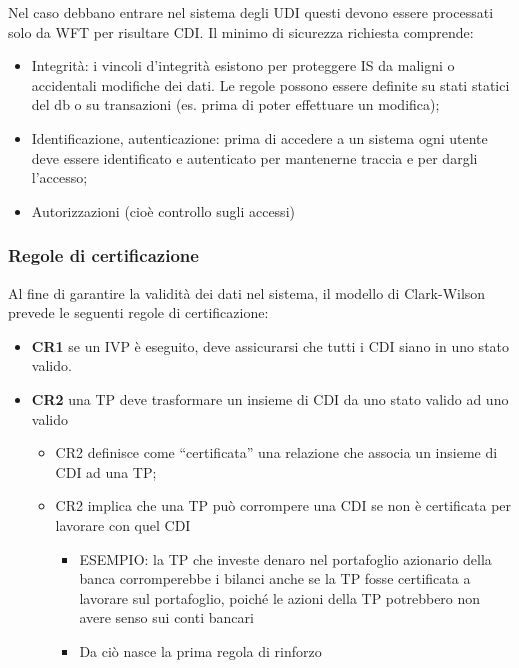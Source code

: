 Nel caso debbano entrare nel sistema degli UDI questi devono essere processati 
solo da WFT per
risultare CDI.
Il minimo di sicurezza richiesta comprende:
\begin{itemize}
      \item Integrità: i vincoli d’integrità esistono per proteggere IS da
            maligni o accidentali modifiche
            dei dati. Le regole possono essere definite su stati statici del db 
            o su transazioni (es. prima
            di poter effettuare un modifica);
      \item Identificazione, autenticazione: prima di accedere a un sistema ogni
            utente deve essere
            identificato e autenticato per mantenerne traccia e per dargli 
            l’accesso;
      \item Autorizzazioni (cioè controllo sugli accessi)
\end{itemize}

\subsubsection{Regole di certificazione}
Al fine di garantire la validità dei dati nel sistema, il modello di 
Clark-Wilson prevede le seguenti
regole di certificazione:
\begin{itemize}
      \item \textbf{CR1} se un IVP è eseguito, deve assicurarsi che tutti i CDI
            siano in uno stato valido.
      \item \textbf{CR2} una TP deve trasformare un insieme di CDI da uno stato
            valido ad uno valido
            \begin{itemize}
                  \item CR2 definisce come “certificata” una relazione che
                        associa un insieme di CDI ad
                        una TP;
                  \item CR2 implica che una TP può corrompere una CDI se non è
                        certificata per lavorare
                        con quel CDI
                        \begin{itemize}
                              \item ESEMPIO: la TP che investe denaro nel
                                    portafoglio azionario della banca
                                    corromperebbe i bilanci anche se la TP 
                                    fosse certificata a lavorare sul
                                    portafoglio, poiché le azioni della TP 
                                    potrebbero non avere senso sui conti
                                    bancari
                              \item Da ciò nasce la prima regola di rinforzo
                        \end{itemize}
            \end{itemize}
\end{itemize}

